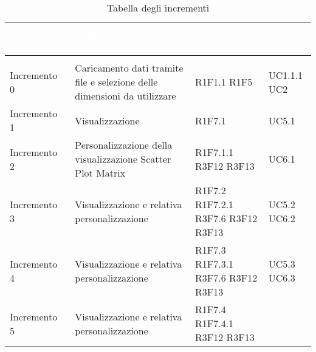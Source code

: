 \begin{longtable}{C{3cm} C{7cm} C{2cm} C{2cm}}
\textcolor{white}{\textbf{Incremento}} & 
\textcolor{white}{\textbf{Obiettivo dell'incremento}} & 
\textcolor{white}{\textbf{Requisiti}} &
\textcolor{white}{\textbf{Casi d'uso}}\\
\endfirsthead
{}\\
\endfoot
{}\caption{Tabella degli incrementi}
\endlastfoot

Incremento 0 & 
Caricamento dati tramite file e selezione delle dimensioni da utilizzare & 
R1F1.1 \newline R1F5 & 
UC1.1.1 \newline UC2\\
Incremento 1 &
Visualizzazione  & 
R1F7.1 &  
UC5.1 \\
Incremento 2 & 
Personalizzazione della visualizzazione Scatter Plot Matrix & 
R1F7.1.1 \newline R3F12 \newline R3F13& 
UC6.1\\
Incremento 3 & 
Visualizzazione  e relativa personalizzazione & 
R1F7.2 \newline R1F7.2.1 \newline R3F7.6 \newline R3F12 \newline R3F13& 
UC5.2 \newline UC6.2\\
Incremento 4 & 
Visualizzazione  e relativa personalizzazione & 
R1F7.3 \newline R1F7.3.1 \newline R3F7.6 \newline R3F12 \newline R3F13& 
UC5.3 \newline UC6.3\\
Incremento 5 & 
Visualizzazione  e relativa personalizzazione & 
R1F7.4 \newline R1F7.4.1 \newline R3F12 \newline R3F13& 

\end{longtable}

